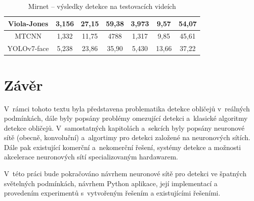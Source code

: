 \begin{table}[H]
\begin{tabular}{c|ccc|ccc|}
  \multicolumn{1}{|c|}{\cellcolor[HTML]{E0DBDB}Viola-Jones}                  & \multicolumn{1}{c|}{3,156}                                  & \multicolumn{1}{c|}{27,15}                                  & 59,38          & \multicolumn{1}{c|}{3,973}                                  & \multicolumn{1}{c|}{9,57}                                   & 54,07          \\ \hline
  \multicolumn{1}{|c|}{\cellcolor[HTML]{E0DBDB}MTCNN}                        & \multicolumn{1}{c|}{1,332}                                  & \multicolumn{1}{c|}{11,75}                                  & 4788           & \multicolumn{1}{c|}{1,317}                                  & \multicolumn{1}{c|}{9,85}                                   & 45,61          \\ \hline
  \multicolumn{1}{|c|}{\cellcolor[HTML]{E0DBDB}YOLOv7-face}                  & \multicolumn{1}{c|}{5,238}                                  & \multicolumn{1}{c|}{23,86}                                  & 35,90          & \multicolumn{1}{c|}{5,430}                                  & \multicolumn{1}{c|}{13,66}                                  & 37,22          \\ \hline
  \end{tabular}
  \label{tabulka:mirnet}
  \caption{Mirnet -- výsledky detekce na testovacích videích}
\end{table}

\chapter{Závěr}
\label{kapitola:zaver}
V~rámci tohoto textu byla představena problematika detekce obličejů v~reálných podmínkách, dále byly popsány problémy omezující detekci a~klasické algoritmy detekce obličejů. V~samostatných kapitolách a~sekcích byly popsány neuronové sítě (obecně, konvoluční) a~algortimy pro detekci založené na neuronových sítích. Dále pak existující komerční a~nekomerční řešení, systémy detekce a možnosti akcelerace neuronových sítí specializovaným hardawarem.

V~této práci bude pokračováno návrhem neuronové sítě pro detekci ve špatných světelných podmínkách, návrhem Python aplikace, její implementací a provedením experimentů s~vytvořeným řešením a existujícími řešeními.